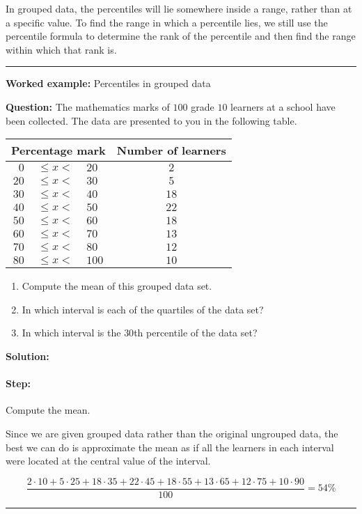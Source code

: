 \documentclass[a4paper,11pt]{report}
\newenvironment{wex}[3]%
{\rule{\linewidth}{0.5mm}
\textbf{Worked example:} #1

\textbf{Question:} #2

\textbf{Solution:} #3}%
{\rule{\linewidth}{0.5mm}}
\newcommand{\westep}[1]{\paragraph{Step:} #1}
\begin{document}
In grouped data, the percentiles will lie somewhere inside a range,
rather than at a specific value. To find the range in which a
percentile lies, we still use the percentile formula to determine the
rank of the percentile and then find the range within which that rank
is.

\begin{wex}{Percentiles in grouped data}{
    The mathematics marks of $100$ grade $10$ learners at a school have
    been collected. The data are presented to you in the following
    table.
    \begin{center}
      \begin{tabular}{r@{\ }c@{\ }lc}
        \toprule
        \multicolumn{3}{c}{Percentage mark} & Number of learners \\
        \midrule
         $0$ & $ \le x < $ &  $20$ &  $2$ \\
        $20$ & $ \le x < $ &  $30$ &  $5$ \\
        $30$ & $ \le x < $ &  $40$ & $18$ \\
        $40$ & $ \le x < $ &  $50$ & $22$ \\
        $50$ & $ \le x < $ &  $60$ & $18$ \\
        $60$ & $ \le x < $ &  $70$ & $13$ \\
        $70$ & $ \le x < $ &  $80$ & $12$ \\
        $80$ & $ \le x < $ & $100$ & $10$ \\
        \bottomrule
      \end{tabular}
    \end{center}

    \begin{enumerate}
    \item Compute the mean of this grouped data set.
    \item In which interval is each of the quartiles of the data set?
    \item In which interval is the $30$th percentile of the data set?
    \end{enumerate}
}{

  \westep{Compute the mean.}

  Since we are given grouped data rather than the original ungrouped
  data, the best we can do is approximate the mean as if all the
  learners in each interval were located at the central value of the
  interval.

  \begin{equation}
    \frac{
         2 \cdot 10
      +  5 \cdot 25
      + 18 \cdot 35
      + 22 \cdot 45
      + 18 \cdot 55
      + 13 \cdot 65
      + 12 \cdot 75
      + 10 \cdot 90
    }{100}
    = 54\%
  \end{equation}

}
\end{wex}
\end{document}
